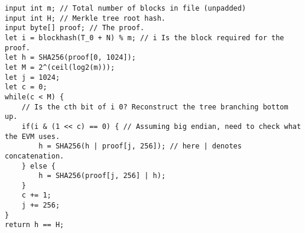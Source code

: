\documentclass[oneside]{article}
\begin{document}
\begin{verbatim}
input int m; // Total number of blocks in file (unpadded)
input int H; // Merkle tree root hash.
input byte[] proof; // The proof.
let i = blockhash(T_0 + N) % m; // i Is the block required for the proof.
let h = SHA256(proof[0, 1024]);
let M = 2^(ceil(log2(m)));
let j = 1024;
let c = 0;
while(c < M) {
    // Is the cth bit of i 0? Reconstruct the tree branching bottom up. 
    if(i & (1 << c) == 0) { // Assuming big endian, need to check what the EVM uses.
        h = SHA256(h | proof[j, 256]); // here | denotes concatenation.
    } else {
        h = SHA256(proof[j, 256] | h);
    }
    c += 1;
    j += 256;
}
return h == H;
\end{verbatim}
\end{document}
